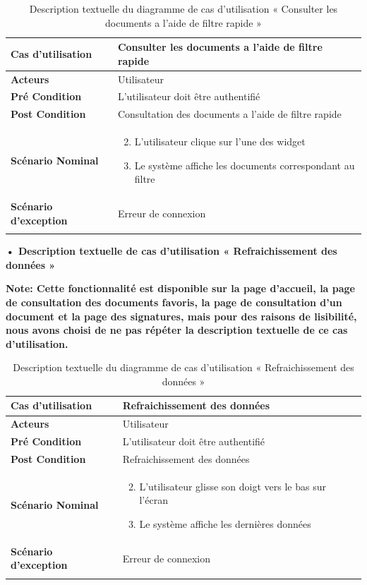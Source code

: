 \begin{longtable}{|p{5cm}|p{10cm}|}
\hline
\textbf{Cas d'utilisation}&Consulter les documents a l'aide de filtre rapide\\
\hline
\textbf{Acteurs}&Utilisateur \\
\hline
\textbf{Pré Condition}&L'utilisateur doit être authentifié\\
\hline
\textbf{Post Condition}&Consultation des documents a l'aide de filtre rapide\\
\hline
\textbf{Scénario Nominal}&
\vspace{-\baselineskip}
\begin{enumerate}
    \setcounter{enumi}{1}
      \item L'utilisateur clique sur l'une des widget
      \item Le système affiche les documents correspondant au filtre
\end{enumerate}\\
\hline
\textbf{Scénario d'exception}&Erreur de connexion\\
\hline
\caption{Description textuelle du diagramme de cas d'utilisation « Consulter les documents a l'aide de filtre rapide »}
\label{tab:use_case_consulter_documents_filtre_rapide}
\end{longtable}

\textbf{•	Description textuelle de cas d'utilisation « Refraichissement
des données »}

\textbf{Note: Cette fonctionnalité est disponible sur la page d'accueil, la page de consultation des documents favoris, la page de consultation d'un document et la page des signatures, mais pour des raisons de lisibilité, nous avons choisi de ne pas répéter la description textuelle de ce cas d'utilisation.}

\begin{longtable}{|p{5cm}|p{10cm}|}
\hline
\textbf{Cas d'utilisation}&Refraichissement des données\\
\hline
\textbf{Acteurs}&Utilisateur \\
\hline
\textbf{Pré Condition}&L'utilisateur doit être authentifié\\
\hline
\textbf{Post Condition}&Refraichissement des données\\
\hline
\textbf{Scénario Nominal}&
\vspace{-\baselineskip}
\begin{enumerate}
    \setcounter{enumi}{1}
      \item L'utilisateur glisse son doigt vers le bas sur l'écran
      \item Le système affiche les dernières données
\end{enumerate}\\
\hline
\textbf{Scénario d'exception}&Erreur de connexion\\
\hline
\caption{Description textuelle du diagramme de cas d'utilisation « Refraichissement des données »}
\label{tab:use_case_refraichissement_donnees}
\end{longtable}

